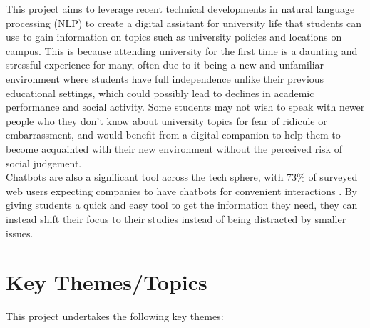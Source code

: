 \documentclass[12pt]{report}
\begin{document}
    \noindent This project aims to leverage recent technical developments in natural language processing (NLP)
    to create a digital assistant for university life that students can use to gain information on topics
    such as university policies and locations on campus. This is because attending university for the first time
    is a daunting and stressful experience for many, often due to it being a new and unfamiliar environment 
    where students have full independence unlike their previous educational settings, which could possibly 
    lead to declines in academic performance and social activity. Some students may not 
    wish to speak with newer people who they don't know about university topics for fear of 
    ridicule or embarrassment, and would benefit from a digital companion to help them to become 
    acquainted with their new environment without the perceived risk of social judgement.\\

    \noindent Chatbots are also a significant tool across the tech sphere, with 73\% of surveyed web users expecting
    companies to have chatbots for convenient interactions \autocite{chatbotStats}. By giving students a 
    quick and easy tool to get the information they need, they can instead shift their focus to their studies
    instead of being distracted by smaller issues.

    

    \section{Key Themes/Topics}
    This project undertakes the following key themes:
\end{document}
